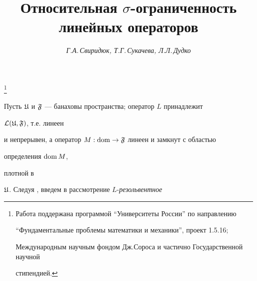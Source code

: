 





\author{\it Г.А.\,Свиридюк, Т.Г.\,Сукачева, Л.Л.\,Дудко} 


\title{Относительная $\sigma$-ограниченность\\ 


линейных операторов} 


 


\thanks{Работа поддержана программой ``Университеты России'' по направлению 


``Фундаментальные проблемы математики и механики'', проект 1.5.16; 


Международным научным фондом Дж.Сороса и частично Государственной научной 


стипендией.} 


\date{} 




 


\pagestyle{plain} %


 


 




 


\maketitle 


 




 


 


Пусть $\frak U$ и $\frak F$ --- банаховы пространства; оператор $L$ принадлежит 


$\cal L(\frak U,\frak F)$, т.е. линеен 


и непрерывен, а оператор $M:\operatorname{dom}\to \frak F$ линеен и замкнут с областью 


определения $\operatorname{dom} M$, 


плотной в 


$\frak U$. Следуя \cite{S1}, введем в рассмотрение $L$-{\it резольвентное} 


